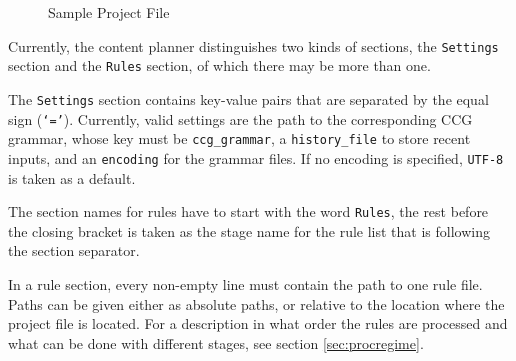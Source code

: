 \documentclass[11pt,a4paper]{report}
\begin{document}
\begin{figure}[htbp]
\centering{}
  \caption{Sample Project File}
  \label{fig:projectfile}
\end{figure}

Currently, the content planner distinguishes two kinds of sections, the
\texttt{Settings} section and the \texttt{Rules} section, of which there may be
more than one.

The \texttt{Settings} section contains key-value pairs that are separated by
the equal sign (\texttt{`='}). Currently, valid settings are the path to the
corresponding CCG grammar, whose key must be \texttt{ccg\_grammar}, a
\texttt{history\_file} to store recent inputs, and an \texttt{encoding} for the
grammar files. If no encoding is specified, \texttt{UTF-8} is taken as a
default.

The section names for rules have to start with the word \texttt{Rules}, the
rest before the closing bracket is taken as the stage name for the rule
list that is following the section separator.

In a rule section, every non-empty line must contain the path to one rule
file. Paths can be given either as absolute paths, or relative to the location
where the project file is located. For a description in what order the rules
are processed and what can be done with different stages, see section
\ref{sec:procregime}.
\end{document}
